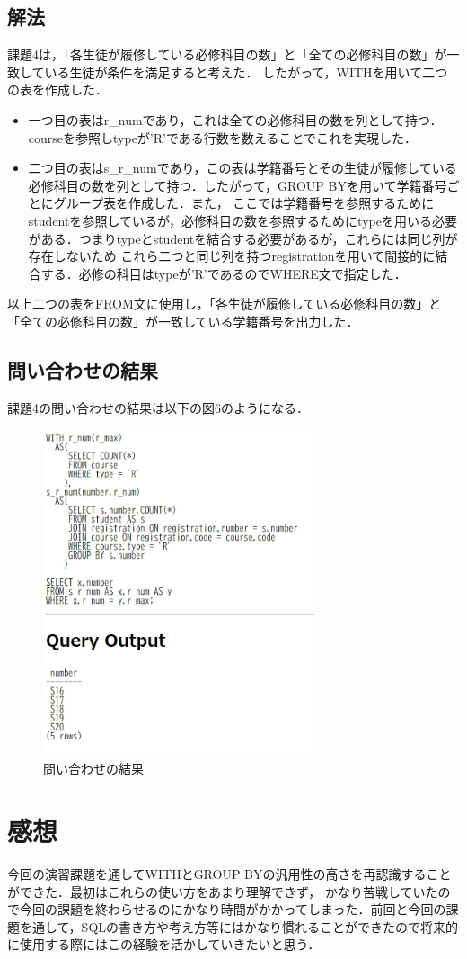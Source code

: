 \documentclass[dvipdfmx]{jarticle}
\begin{document}
\subsection{解法}
課題4は，「各生徒が履修している必修科目の数」と「全ての必修科目の数」が一致している生徒が条件を満足すると考えた．
したがって，WITHを用いて二つの表を作成した．\\
\begin{itemize}
    \item 一つ目の表はr\_numであり，これは全ての必修科目の数を列として持つ．courseを参照しtypeが'R'である行数を数えることでこれを実現した．
    \item 二つ目の表はs\_r\_numであり，この表は学籍番号とその生徒が履修している必修科目の数を列として持つ．したがって，GROUP BYを用いて学籍番号ごとにグループ表を作成した．また，
    ここでは学籍番号を参照するためにstudentを参照しているが，必修科目の数を参照するためにtypeを用いる必要がある．つまりtypeとstudentを結合する必要があるが，これらには同じ列が存在しないため
    これら二つと同じ列を持つregistrationを用いて間接的に結合する．必修の科目はtypeが'R'であるのでWHERE文で指定した．
\end{itemize}
以上二つの表をFROM文に使用し，「各生徒が履修している必修科目の数」と「全ての必修科目の数」が一致している学籍番号を出力した．
\subsection{問い合わせの結果}
課題4の問い合わせの結果は以下の図6のようになる．
\begin{figure}[h]
    \centering
    \includegraphics[width = 8cm]{4.png}
    \caption{問い合わせの結果}
\end{figure}
\section{感想}
今回の演習課題を通してWITHとGROUP BYの汎用性の高さを再認識することができた．最初はこれらの使い方をあまり理解できず，
かなり苦戦していたので今回の課題を終わらせるのにかなり時間がかかってしまった．前回と今回の課題を通して，SQLの書き方や考え方等にはかなり慣れることができたので将来的に使用する際にはこの経験を活かしていきたいと思う．
\end{document}
